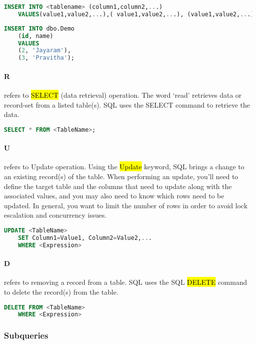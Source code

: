 \begin{lstlisting}[language=SQL]
	INSERT INTO <tablename> (column1,column2,...) 
	VALUES(value1,value2,...),( value1,value2,...), (value1,value2,...)...
\end{lstlisting}

\begin{lstlisting}[language=SQL]
	INSERT INTO dbo.Demo
	(id, name)
	VALUES
	(2, 'Jayaram'),
	(3, 'Pravitha');
\end{lstlisting}

\paragraph{R} refers to \hl{SELECT} (data retrieval) operation. The word ‘read’ retrieves data or record-set from a listed table(s). SQL uses the SELECT command to retrieve the data.

\begin{lstlisting}[language=SQL]
	SELECT * FROM <TableName>;
\end{lstlisting}

\paragraph{U} refers to Update operation. Using the \hl{Update} keyword, SQL brings a change to an existing record(s) of the table. When performing an update, you’ll need to define the target table and the columns that need to update along with the associated values, and you may also need to know which rows need to be updated. In general, you want to limit the number of rows in order to avoid lock escalation and concurrency issues.

\begin{lstlisting}[language=SQL]
	UPDATE <TableName>
	SET Column1=Value1, Column2=Value2,...
	WHERE <Expression>
\end{lstlisting}

\paragraph{D} refers to removing a record from a table. SQL uses the SQL \hl{DELETE} command to delete the record(s) from the table.

\begin{lstlisting}[language=SQL]
	DELETE FROM <TableName>
	WHERE <Expression>
\end{lstlisting}

\subsubsection{Subqueries}
\label{sec:Subquery}



